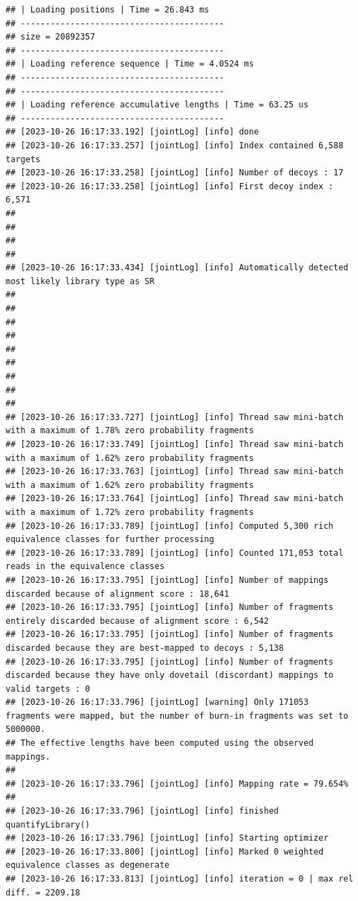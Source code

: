 \documentclass[
]{book}
\begin{document}
\begin{verbatim}
## | Loading positions | Time = 26.843 ms
## -----------------------------------------
## size = 20892357
## -----------------------------------------
## | Loading reference sequence | Time = 4.0524 ms
## -----------------------------------------
## -----------------------------------------
## | Loading reference accumulative lengths | Time = 63.25 us
## -----------------------------------------
## [2023-10-26 16:17:33.192] [jointLog] [info] done
## [2023-10-26 16:17:33.257] [jointLog] [info] Index contained 6,588 targets
## [2023-10-26 16:17:33.258] [jointLog] [info] Number of decoys : 17
## [2023-10-26 16:17:33.258] [jointLog] [info] First decoy index : 6,571 
## 
## 
## 
## 
## [2023-10-26 16:17:33.434] [jointLog] [info] Automatically detected most likely library type as SR
## 
## 
## 
## 
## 
## 
## 
## 
## 
## [2023-10-26 16:17:33.727] [jointLog] [info] Thread saw mini-batch with a maximum of 1.78% zero probability fragments
## [2023-10-26 16:17:33.749] [jointLog] [info] Thread saw mini-batch with a maximum of 1.62% zero probability fragments
## [2023-10-26 16:17:33.763] [jointLog] [info] Thread saw mini-batch with a maximum of 1.62% zero probability fragments
## [2023-10-26 16:17:33.764] [jointLog] [info] Thread saw mini-batch with a maximum of 1.72% zero probability fragments
## [2023-10-26 16:17:33.789] [jointLog] [info] Computed 5,300 rich equivalence classes for further processing
## [2023-10-26 16:17:33.789] [jointLog] [info] Counted 171,053 total reads in the equivalence classes 
## [2023-10-26 16:17:33.795] [jointLog] [info] Number of mappings discarded because of alignment score : 18,641
## [2023-10-26 16:17:33.795] [jointLog] [info] Number of fragments entirely discarded because of alignment score : 6,542
## [2023-10-26 16:17:33.795] [jointLog] [info] Number of fragments discarded because they are best-mapped to decoys : 5,138
## [2023-10-26 16:17:33.795] [jointLog] [info] Number of fragments discarded because they have only dovetail (discordant) mappings to valid targets : 0
## [2023-10-26 16:17:33.796] [jointLog] [warning] Only 171053 fragments were mapped, but the number of burn-in fragments was set to 5000000.
## The effective lengths have been computed using the observed mappings.
## 
## [2023-10-26 16:17:33.796] [jointLog] [info] Mapping rate = 79.654%
## 
## [2023-10-26 16:17:33.796] [jointLog] [info] finished quantifyLibrary()
## [2023-10-26 16:17:33.796] [jointLog] [info] Starting optimizer
## [2023-10-26 16:17:33.800] [jointLog] [info] Marked 0 weighted equivalence classes as degenerate
## [2023-10-26 16:17:33.813] [jointLog] [info] iteration = 0 | max rel diff. = 2209.18

\end{verbatim}
\end{document}
